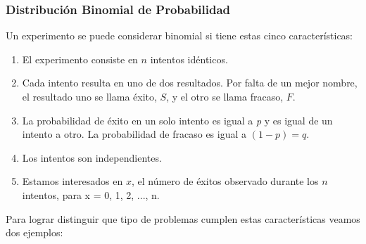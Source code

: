 \documentclass[]{article}
\begin{document}
\subsubsection{Distribución Binomial de Probabilidad}
 Un experimento se puede considerar binomial si tiene estas cinco características:
 \begin{enumerate}
 	\item El experimento consiste en $n$ intentos idénticos.
 	\item Cada intento resulta en uno de dos resultados. Por falta de un mejor nombre, el resultado uno se llama éxito, $S$, y el otro se llama fracaso, $F$.
 	\item La probabilidad de éxito en un solo intento es igual a \textit{p} y es igual de un intento a otro. La probabilidad de fracaso es igual a $(1 - p) = q$.
 	\item Los intentos son independientes.
 	\item Estamos interesados en $x$, el número de éxitos observado durante los $n$ intentos, para x = 0, 1, 2, ..., n.
 \end{enumerate}
 Para lograr distinguir que tipo de problemas cumplen estas características veamos dos ejemplos:
\end{document}
